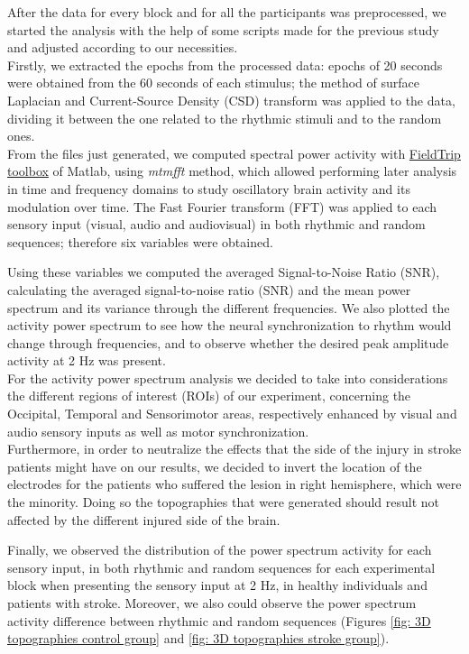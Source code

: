 After the data for every block and for all the participants was preprocessed, we started the analysis with the help of some scripts made for the previous study and adjusted according to our necessities. \\
Firstly, we extracted the epochs from the processed data: epochs of 20 seconds were obtained from the 60 seconds of each stimulus; the method of surface Laplacian and Current-Source Density (CSD) transform was applied to the data, dividing it between the one related to the rhythmic stimuli and to the random ones. \\
From the files just generated, we computed spectral power activity with \href{https://www.fieldtriptoolbox.org/}{FieldTrip toolbox} of Matlab, using \textit{mtmfft} method, which allowed performing later analysis in time and frequency domains to study oscillatory brain activity and its modulation over time. The Fast Fourier transform (FFT) was applied to each sensory input (visual, audio and audiovisual) in both rhythmic and random sequences; therefore six variables were obtained. 

Using these variables we computed the averaged Signal-to-Noise Ratio (SNR), calculating the averaged signal-to-noise ratio (SNR) and the mean power spectrum and its variance through the different frequencies. We also plotted the activity power spectrum to see how the neural synchronization to rhythm would change through frequencies, and to observe whether the desired peak amplitude activity at 2 Hz was present. \\
For the activity power spectrum analysis we decided to take into considerations the different regions of interest (ROIs) of our experiment, concerning the Occipital, Temporal and Sensorimotor areas, respectively enhanced by visual and audio sensory inputs as well as motor synchronization. \\
Furthermore, in order to neutralize the effects that the side of the injury in stroke patients might have on our results, we decided to invert the location of the electrodes for the patients who suffered the lesion in right hemisphere, which were the minority. Doing so the topographies that were generated should result not affected by the different injured side of the brain.  

Finally, we observed the distribution of the power spectrum activity for each sensory input, in both rhythmic and random sequences for each experimental block when presenting the sensory input at 2 Hz, in healthy individuals and patients with stroke. Moreover, we also could observe the power spectrum activity difference between rhythmic and random sequences (Figures \ref{fig: 3D topographies control group} and \ref{fig: 3D topographies stroke group}). 

